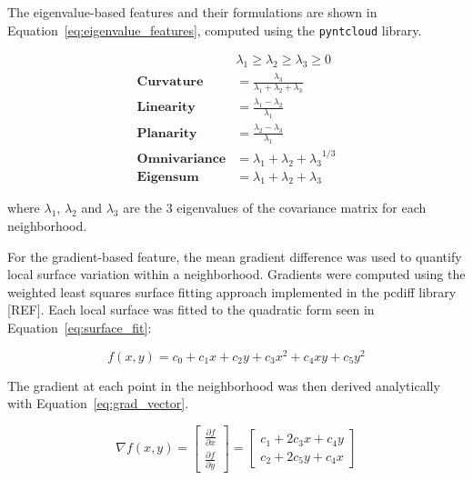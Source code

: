 The eigenvalue-based features and their formulations are shown in Equation~\ref{eq:eigenvalue_features}, computed using the \texttt{pyntcloud} library. 

\begin{equation}
\begin{aligned}
    &\lambda_1 \geq \lambda_2 \geq \lambda_3 \geq 0 \\
    \textbf{Curvature} &= \frac{\lambda_3}{\lambda_1 + \lambda_2 + \lambda_3} \\
    \textbf{Linearity} &= \frac{\lambda_1 - \lambda_2}{\lambda_1} \\
    \textbf{Planarity} &= \frac{\lambda_2 - \lambda_3}{\lambda_1} \\
    \textbf{Omnivariance} &= {\lambda_1 + \lambda_2 + \lambda_3}^{1/3} \\
    \textbf{Eigensum} &= \lambda_1 + \lambda_2 + \lambda_3
\end{aligned}
\label{eq:eigenvalue_features}
\end{equation}

where $\lambda_1$, $\lambda_2$ and $\lambda_3$ are the 3 eigenvalues of the covariance matrix for each neighborhood.

For the gradient-based feature, the mean gradient difference was used to quantify local surface variation within a neighborhood. Gradients were computed using the weighted least squares surface fitting approach implemented in the pcdiff library [REF]. Each local surface was fitted to the quadratic form seen in Equation~\ref{eq:surface_fit}:

\begin{equation}
f(x, y) = c_0 + c_1 x + c_2 y + c_3 x^2 + c_4 x y + c_5 y^2
\label{eq:surface_fit}
\end{equation}

The gradient at each point in the neighborhood was then derived analytically with Equation~\ref{eq:grad_vector}.

\begin{equation}
\nabla f(x, y) =
\begin{bmatrix}
\frac{\partial f}{\partial x} \\
\frac{\partial f}{\partial y}
\end{bmatrix}
=
\begin{bmatrix}
c_1 + 2c_3 x + c_4 y \\
c_2 + 2c_5 y + c_4 x
\end{bmatrix}
\label{eq:grad_vector}
\end{equation}

